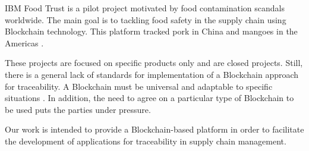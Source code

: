 IBM Food Trust is a pilot project motivated by food contamination scandals worldwide. The main goal is to tackling food safety in the supply chain using Blockchain technology. This platform tracked pork in China and mangoes in the Americas \cite{kamath2018food}.

These projects are focused on specific products only and are closed projects. Still, there is a general lack of standards for implementation of a Blockchain approach for traceability. A Blockchain must be universal and adaptable to specific situations \cite{valenta2017comparison}. In addition, the need to agree on a particular type of Blockchain to be used puts the parties under pressure. 

Our work is intended to provide a Blockchain-based platform in order to facilitate the development of applications for traceability in supply chain management.